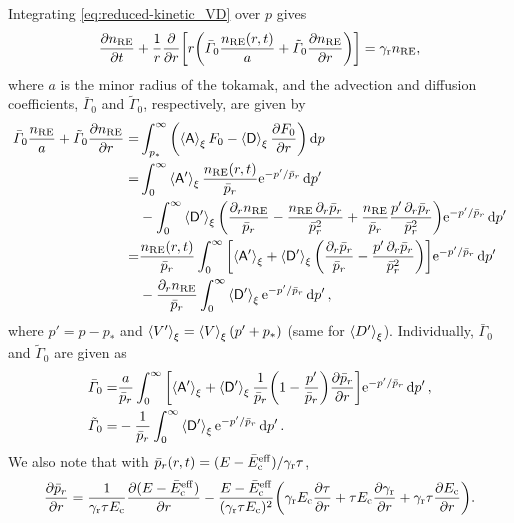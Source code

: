 \documentclass[11pt,a4paper,english
]{article}
\newcommand{\pd}{\ensuremath{\partial}}
\newcommand{\ee}{\mathrm{e}}
\newcommand{\nRE}{\ensuremath{n_{\rm RE}}}
\begin{document}
Integrating \eqref{eq:reduced-kinetic_VD} over $p$ gives
\begin{equation}\label{eq:n_RE}
\pdv{\nRE}{t} + \frac{1}{r}\pdv{r}
\qty[r\qty(\bar\varGamma_{0}\frac{\nRE(r,t)}{a}+\tilde\varGamma_{0}\pdv{\nRE}{r})]
=\gamma_{\rm r}\nRE,
\end{equation}
where $a$ is the minor radius of the tokamak, and the advection and
diffusion coefficients, $\bar\varGamma_{0}$ and $\tilde\varGamma_{0}$,
respectively, are given by
\begin{equation}
\begin{aligned}
\bar\varGamma_{0}\frac{\nRE}{a}+\tilde\varGamma_{0}\pdv{\nRE}{r}
=&\int_{p_*}^{\infty}\qty(\ev{\mathsf{A}}_{\xi}F_0-\ev{\mathsf{D}}_{\xi}\pdv{F_0}{r})\dd{p}\\
=&
\int_{0}^{\infty}\ev{\mathsf{A'}}_{\xi}\frac{\nRE(r,t)}{\bar{p}_r}\ee^{-p'/\bar{p}_r}\dd{p'}\\
&-\int_{0}^{\infty}\ev{\mathsf{D'}}_{\xi}
\qty(\frac{\pd_r\nRE}{\bar{p}_r}-\frac{\nRE\,\pd_r\bar{p}_r}{\bar{p}_r^2}
+\frac{\nRE}{\bar{p}_r}\frac{p'\,\pd_r\bar{p}_r}{\bar{p}_r^2})
\ee^{-p'/\bar{p}_r}\dd{p'}\\
=&\frac{\nRE(r,t)}{\bar{p}_r}
\int_{0}^{\infty}\qty[\ev{\mathsf{A'}}_{\xi} +\ev{\mathsf{D'}}_{\xi}
\qty(\frac{\pd_r\bar{p}_r}{\bar{p}_r}
-\frac{p'\,\pd_r\bar{p}_r}{\bar{p}_r^2})]
\ee^{-p'/\bar{p}_r}\dd{p'}\\
&-\frac{\pd_r\nRE}{\bar{p}_r}\int_{0}^{\infty}\ev{\mathsf{D'}}_{\xi}
\ee^{-p'/\bar{p}_r}\dd{p'},
\end{aligned}
\end{equation}
where $p'=p-p_{*}$ and $\ev{V'}_\xi=\ev{V}_\xi(p'+p_*)$ (same for
$\ev{D'}_\xi$). Individually,  $\bar\varGamma_{0}$ and
$\tilde\varGamma_{0}$ are given as
\begin{align}
\bar\varGamma_{0}
=&
\frac{a}{\bar{p}_r}
\int_{0}^{\infty}\qty[\ev{\mathsf{A'}}_{\xi} +\ev{\mathsf{D'}}_{\xi}
\frac{1}{\bar{p}_r}\qty(1-\frac{p'}{\bar{p}_r})\pdv{\bar{p}_r}{r}]
\ee^{-p'/\bar{p}_r}\dd{p'},
\\
\tilde\varGamma_{0}=&
-\frac{1}{\bar{p}_r}\int_{0}^{\infty}\ev{\mathsf{D'}}_{\xi}
\ee^{-p'/\bar{p}_r}\dd{p'}.
\end{align}
We also note that with %
$\bar{p}_r(r,t)=(E-\bar{E}_{\rm c}^{\rm eff})/\gamma_{\rm r}\tau$, %
\begin{equation}
\pdv{\bar{p}_r}{r}=
\frac{1}{\gamma_{\rm r}\tau E_{\rm c}}
\pdv{(E-\bar{E}_{\rm c}^{\rm eff})}{r}
-\frac{E-\bar{E}_{\rm c}^{\rm eff}}{(\gamma_{\rm r}\tau E_{\rm c})^2}
\qty(\gamma_{\rm r}E_{\rm c}\pdv{\tau}{r}
+\tau E_{\rm c}\pdv{\gamma_{\rm r}}{r}
+\gamma_{\rm r}\tau\pdv{E_{\rm c}}{r}).
\end{equation}
\end{document}
